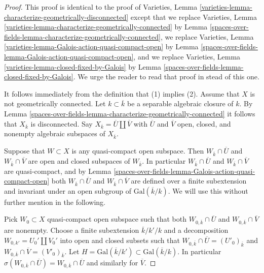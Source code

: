 \begin{proof}
This proof is identical to the proof of
Varieties, Lemma \ref{varieties-lemma-characterize-geometrically-disconnected}
except that
we replace
Varieties, Lemma \ref{varieties-lemma-characterize-geometrically-connected}
by Lemma \ref{spaces-over-fields-lemma-characterize-geometrically-connected},
we replace
Varieties, Lemma \ref{varieties-lemma-Galois-action-quasi-compact-open}
by Lemma \ref{spaces-over-fields-lemma-Galois-action-quasi-compact-open}, and
we replace
Varieties, Lemma \ref{varieties-lemma-closed-fixed-by-Galois}
by Lemma \ref{spaces-over-fields-lemma-closed-fixed-by-Galois}.
We urge the reader to read that proof in stead of this one.

\medskip\noindent
It follows immediately from the definition that (1) implies (2).
Assume that $X$ is not geometrically connected.
Let $k \subset \overline{k}$ be a separable algebraic
closure of $k$. By
Lemma \ref{spaces-over-fields-lemma-characterize-geometrically-connected}
it follows that $X_{\overline{k}}$ is disconnected.
Say $X_{\overline{k}} = \overline{U} \amalg \overline{V}$
with $\overline{U}$ and $\overline{V}$ open, closed, and nonempty
algebraic subspaces of $X_{\overline{k}}$.

\medskip\noindent
Suppose that $W \subset X$ is any quasi-compact open subspace.
Then $W_{\overline{k}} \cap \overline{U}$ and
$W_{\overline{k}} \cap \overline{V}$ are open and closed subspaces of
$W_{\overline{k}}$. In particular $W_{\overline{k}} \cap \overline{U}$ and
$W_{\overline{k}} \cap \overline{V}$ are quasi-compact, and by
Lemma \ref{spaces-over-fields-lemma-Galois-action-quasi-compact-open}
both $W_{\overline{k}} \cap \overline{U}$ and
$W_{\overline{k}} \cap \overline{V}$
are defined over a finite subextension and invariant under an
open subgroup of $\text{Gal}(\overline{k}/k)$.
We will use this without further mention in the following.

\medskip\noindent
Pick $W_0 \subset X$ quasi-compact open subspace such that both
$W_{0, \overline{k}} \cap \overline{U}$ and
$W_{0, \overline{k}} \cap \overline{V}$ are nonempty.
Choose a finite subextension $\overline{k}/k'/k$
and a decomposition $W_{0, k'} = U_0' \amalg V_0'$ into open and closed
subsets such that
$W_{0, \overline{k}} \cap \overline{U} = (U'_0)_{\overline{k}}$ and
$W_{0, \overline{k}} \cap \overline{V} = (V'_0)_{\overline{k}}$.
Let $H = \text{Gal}(\overline{k}/k') \subset \text{Gal}(\overline{k}/k)$.
In particular
$\sigma(W_{0, \overline{k}} \cap \overline{U}) =
W_{0, \overline{k}} \cap \overline{U}$ and similarly for
$\overline{V}$.


\end{proof}

